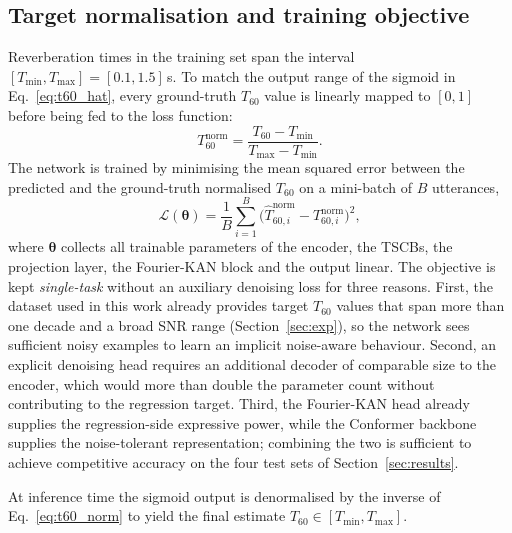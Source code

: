 \documentclass[a4paper,fleqn]{cas-dc}
\begin{document}
\subsection{Target normalisation and training objective}\label{sec:method:loss}

Reverberation times in the training set span the interval
$[T_{\min}, T_{\max}] = [0.1, 1.5]$\,s. To match the output range of the
sigmoid in Eq.~\eqref{eq:t60_hat}, every ground-truth $T_{60}$ value is
linearly mapped to $[0,1]$ before being fed to the loss function:
\begin{equation}\label{eq:t60_norm}
  T_{60}^{\mathrm{norm}}
  = \frac{T_{60} - T_{\min}}{T_{\max} - T_{\min}}.
\end{equation}
The network is trained by minimising the mean squared error between the
predicted and the ground-truth normalised $T_{60}$ on a mini-batch of
$B$ utterances,
\begin{equation}\label{eq:loss}
  \mathcal{L}(\boldsymbol{\theta})
  = \frac{1}{B}\sum_{i=1}^{B}\bigl(\hat{T}_{60,i}^{\mathrm{norm}}
                                  - T_{60,i}^{\mathrm{norm}}\bigr)^{2},
\end{equation}
where $\boldsymbol{\theta}$ collects all trainable parameters of the
encoder, the TSCBs, the projection layer, the Fourier-KAN block and the
output linear. The objective is kept \emph{single-task}
without an auxiliary denoising loss for three reasons. First, the
dataset used in this work already provides
target $T_{60}$ values that span more than one decade and a broad SNR
range (Section~\ref{sec:exp}), so the network sees sufficient noisy
examples to learn an implicit noise-aware behaviour. Second, an explicit
denoising head requires an additional decoder of comparable size to the
encoder, which would more than double the parameter count without
contributing to the regression target. Third, the Fourier-KAN head
already supplies the regression-side expressive power, while the
Conformer backbone supplies the noise-tolerant representation; combining
the two is sufficient to achieve competitive accuracy on the four test
sets of Section~\ref{sec:results}.

At inference time the sigmoid output is denormalised by the inverse of
Eq.~\eqref{eq:t60_norm} to yield the final estimate
$\hat{T}_{60}\in[T_{\min}, T_{\max}]$.




\end{document}
